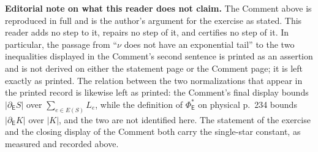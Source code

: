 \documentclass[11pt]{article}
\newcommand{\E}{\mathsf E}
\begin{document}
\medskip\noindent\textbf{Editorial note on what this reader does not claim.}
The Comment above is reproduced in full and is the author's argument for the exercise as stated. This reader adds no step to it, repairs no step of it, and certifies no step of it. In particular, the passage from ``$\nu$ does not have an exponential tail'' to the two inequalities displayed in the Comment's second sentence is printed as an assertion and is not derived on either the statement page or the Comment page; it is left exactly as printed. The relation between the two normalizations that appear in the printed record is likewise left as printed: the Comment's final display bounds $|\partial_{\E}S|$ over $\sum_{e\in E(S)}L_{e}$, while the definition of $\Phi^{*}_{\E}$ on physical p.\ 234 bounds $|\partial_{\E}K|$ over $|K|$, and the two are not identified here. The statement of the exercise and the closing display of the Comment both carry the single-star constant, as measured and recorded above.
\end{document}

